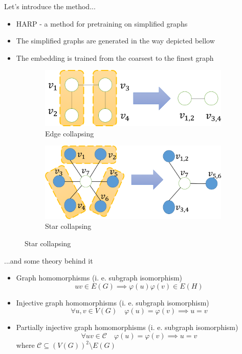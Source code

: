 \documentclass[10pt]{beamer}
\begin{document}
\begin{frame}{Let's introduce the method...}
	\begin{itemize}
		\item HARP - a method for pretraining on simplified graphs
		\item The simplified graphs are generated in the way depicted bellow
		\item The embedding is trained from the coarsest to the finest graph
	\end{itemize}
	\begin{figure}
		\centering
		\begin{subfigure}[t]{0.38\textwidth}
			\centering
			\includegraphics[width=\textwidth]{images/edge_collapsing.png}
			\caption{Edge collapsing}
		\end{subfigure}
		\hspace{2em}
		\begin{subfigure}[t]{0.38\textwidth}
			\centering
			\includegraphics[width=\textwidth]{images/star_collapsing.png}
			\caption{Star collapsing}
		\end{subfigure}
	\end{figure}
\end{frame}

\begin{frame}{...and some theory behind it}
	\begin{itemize}
		\item Graph homomorphisms (i. e. subgraph isomorphism)
\[ uv \in E \left( G \right) \implies \varphi \left( u \right) \varphi \left( v \right) \in E \left( H \right) \]
		\item Injective graph homomorphisms (i. e. subgraph isomorphism)
\[ \forall u, v \in V \left( G \right) \quad \varphi \left( u \right) = \varphi \left( v \right) \implies u = v \]
		\item Partially injective graph homomorphisms (i. e. subgraph isomorphism)
\[ \forall uv \in \mathcal{C} \quad \varphi \left( u \right) = \varphi \left( v \right) \implies u = v \]
			where \( \mathcal{C} \subseteq \left( V \left( G \right) \right)^2 \setminus E \left( G \right) \)
	\end{itemize}
\end{frame}
\end{document}
